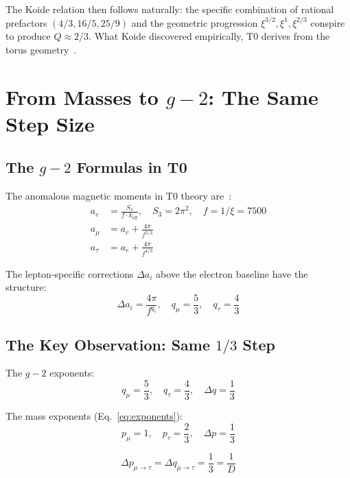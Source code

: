The Koide relation then follows naturally: the specific combination of rational prefactors $(4/3, 16/5, 25/9)$ and the geometric progression $\xi^{3/2}, \xi^1, \xi^{2/3}$ conspire to produce $Q \approx 2/3$. What Koide discovered empirically, T0 derives from the torus geometry~\cite{Pascher116}.

\section{From Masses to $g-2$: The Same Step Size}

\subsection{The $g-2$ Formulas in T0}

The anomalous magnetic moments in T0 theory are~\cite{Pascher018}:
\begin{align}
	a_e &= \frac{S_3}{f \cdot k_\text{eff}}, \quad S_3 = 2\pi^2, \quad f = 1/\xi = 7500 \\
	a_\mu &= a_e + \frac{4\pi}{f^{5/3}} \\
	a_\tau &= a_e + \frac{4\pi}{f^{4/3}}
\end{align}

The lepton-specific corrections $\Delta a_i$ above the electron baseline have the structure:
\begin{equation}
	\Delta a_i = \frac{4\pi}{f^{q_i}}, \quad q_\mu = \frac{5}{3}, \quad q_\tau = \frac{4}{3}
	\label{eq:g2exponents}
\end{equation}

\subsection{The Key Observation: Same $1/3$ Step}

The $g-2$ exponents:
\begin{equation}
	q_\mu = \frac{5}{3}, \quad q_\tau = \frac{4}{3}, \quad \Delta q = \frac{1}{3}
\end{equation}

The mass exponents (Eq.~\ref{eq:exponents}):
\begin{equation}
	p_\mu = 1, \quad p_\tau = \frac{2}{3}, \quad \Delta p = \frac{1}{3}
\end{equation}

\begin{equation}
	\boxed{\Delta p_{\mu\to\tau} = \Delta q_{\mu\to\tau} = \frac{1}{3} = \frac{1}{D}}
\end{equation}

